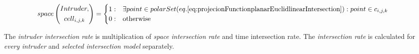 \begin{equation}\label{eq:baseIntersectionProbabilityLineIntersectionType}
    space\left(\begin{gathered}Intruder,\\cell_{i,j,k}\end{gathered}\right)=
    \begin{cases}
        1:&\exists point \in polarSet(eq.\ref{eq:projecionFunctionplanarEuclidlinearIntersection}): point \in c_{i,j,k}\\
        0:&\text{otherwise}
    \end{cases}
\end{equation}

\begin{note}
    The \emph{intruder intersection rate} is multiplication of \emph{space intersection rate} and time intersection rate. The \emph{intersection rate} is calculated for \emph{every intruder} and \emph{selected intersection model} separately.
\end{note}
